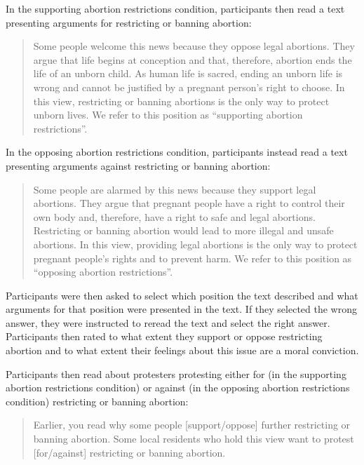 \documentclass[12pt, letterpaper]{article}
\begin{document}
\noindent In the supporting abortion restrictions condition,
participants then read a text presenting arguments for restricting or
banning abortion:

\begin{quote}
Some people welcome this news because they oppose legal abortions. They
argue that life begins at conception and that, therefore, abortion ends
the life of an unborn child. As human life is sacred, ending an unborn
life is wrong and cannot be justified by a pregnant person's right to
choose. In this view, restricting or banning abortions is the only way
to protect unborn lives. We refer to this position as ``supporting
abortion restrictions''.
\end{quote}

\noindent In the opposing abortion restrictions condition, participants
instead read a text presenting arguments against restricting or banning
abortion:

\begin{quote}
Some people are alarmed by this news because they support legal
abortions. They argue that pregnant people have a right to control their
own body and, therefore, have a right to safe and legal abortions.
Restricting or banning abortion would lead to more illegal and unsafe
abortions. In this view, providing legal abortions is the only way to
protect pregnant people's rights and to prevent harm. We refer to this
position as ``opposing abortion restrictions''.
\end{quote}

\noindent Participants were then asked to select which position the text
described and what arguments for that position were presented in the
text. If they selected the wrong answer, they were instructed to reread
the text and select the right answer. Participants then rated to what
extent they support or oppose restricting abortion and to what extent
their feelings about this issue are a moral conviction.

Participants then read about protesters protesting either for (in the
supporting abortion restrictions condition) or against (in the opposing
abortion restrictions condition) restricting or banning abortion:

\begin{quote}
Earlier, you read why some people {[}support/oppose{]} further
restricting or banning abortion. Some local residents who hold this view
want to protest {[}for/against{]} restricting or banning abortion.
\end{quote}
\end{document}
